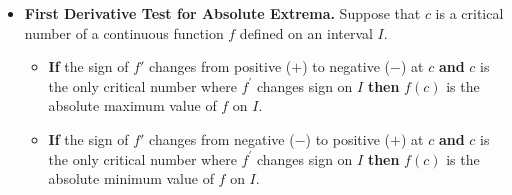 \documentclass[11pt]{article}
\begin{document}
\begin{itemize}
\begin{minipage}{0.75\textwidth}
\begin{enumerate}
\item  The largest value from (b)  will be the absolute maximum value of $f$ on $[a, b]$ and the smallest value from (b) will be the absolute minimum value of $f$ on $[a, b]$. 
\end{enumerate}
\end{minipage}
%
\hfill
%
\begin{minipage}{0.2\textwidth}
\begin{center}
\begin{tabular}{|c|c|}
\hline 
$x$ & $f(x)$\tabularnewline
\hline 
\hline 
$a$ & $f(a)$\tabularnewline
\hline 
$b$ & $f(b)$\tabularnewline
\hline 
$c_1$ & $f(c_1)$\tabularnewline
\hline 
$c_2$ & $f(c_2)$\tabularnewline
\hline 
$\vdots$ &$\vdots $\tabularnewline
\hline 
$c_n$ & $f(c_n)$\tabularnewline
\hline 
\end{tabular}
\end{center}
\end{minipage}
\vfill
\item
\textbf{First Derivative Test for Absolute Extrema.}
Suppose that $c$ is a critical number of a continuous function $f$ defined on an interval $I$.
    \begin{itemize}
    \item {\bf If} the sign of $f'$ changes from positive ($+$) to negative ($-$) at $c$ {\bf and} $c$ is the only critical number where $f^{\prime}$ changes sign on $I$
    {\bf then} $f(c)$ is the absolute maximum value of $f$ on $I$.
    \item {\bf If} the sign of $f'$ changes from negative ($-$) to positive ($+$) at $c$ {\bf and} $c$ is the only critical number where $f^{\prime}$ changes sign on $I$
    {\bf then} $f(c)$ is the absolute minimum value of $f$ on $I$.\\
    \end{itemize}
\end{itemize}
\newpage
\end{document}
